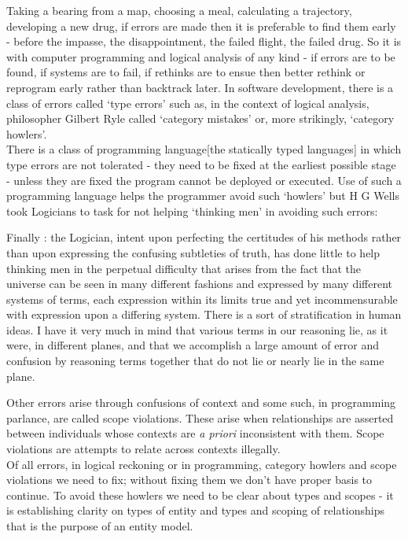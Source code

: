 \noindent Taking a bearing from a map, choosing a meal, calculating a trajectory, developing a new drug, if errors are made then it is preferable to find them early - before the impasse, the disappointment, the failed flight, the failed drug. So it is with computer programming and logical analysis of any kind - if errors are to be found, if systems are to fail, if rethinks are to ensue then better rethink or reprogram early rather than backtrack later. In software development, there is a class of errors called `type errors' such as, in the context of logical analysis, philosopher Gilbert Ryle called `category mistakes' or, more strikingly, `category howlers'.\\

\noindent There is a class of programming language[the statically typed languages] in which type errors are not tolerated - they need to be fixed at the earliest possible stage - unless they are fixed the program cannot be deployed or executed. Use of such a programming language helps the programmer avoid such `howlers'  but H G Wells took Logicians to task for not helping `thinking men’ in avoiding such errors: 

\begin{erquote}
Finally : the Logician, intent upon perfecting the certitudes of his methods rather than upon expressing the confusing subtleties of truth, has done little to help thinking men in the perpetual difficulty that arises from the fact that the universe can be seen in many different fashions and expressed by many different systems of terms, each expression within its limits true and yet incommensurable with expression upon a differing system. There is a sort of stratification in human ideas. I have it very much in mind that various terms in our reasoning lie, as it were, in different planes, and that we accomplish a large amount of error and confusion by reasoning terms together that do not lie or nearly lie in the same plane.
\end{erquote}

\noindent Other errors arise through confusions of context and some such, in programming parlance, are called scope violations. These arise when relationships are asserted between individuals whose contexts are \textit{a priori} inconsistent with them. Scope violations are attempts to relate across contexts illegally. \\

\noindent Of all errors, in logical reckoning or in programming, category howlers and scope violations we need to fix; without fixing them we don't have proper basis to continue.  To avoid these howlers  we need to be clear about types and scopes -  it is establishing clarity on types of entity and types and scoping of relationships that is the purpose of an entity model. \\







